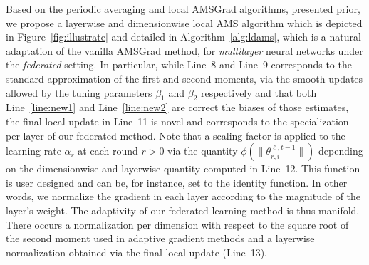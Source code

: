 \documentclass[11pt]{article}
\begin{document}
Based on the periodic averaging and local AMSGrad algorithms, presented prior, we propose a layerwise and dimensionwise local AMS algorithm which is depicted in Figure~\ref{fig:illustrate} and detailed in Algorithm~\ref{alg:ldams}, which is a natural adaptation of the vanilla AMSGrad method, for \emph{multilayer} neural networks under the \emph{federated} setting.
In particular, while Line~8 and Line~9 corresponds to the standard approximation of the first and second moments, via the smooth updates allowed by the tuning parameters $\beta_1$ and $\beta_2$ respectively and that both Line~\ref{line:new1} and Line~\ref{line:new2} are correct the biases of those estimates, the final local update in Line~11 is novel and corresponds to the specialization per layer of our federated method.
Note that a scaling factor is applied to the learning rate $\alpha_r$ at each round $r>0$ via the quantity $\phi(\|\theta_{r,i}^{\ell,t-1}\|)$ depending on the dimensionwise and layerwise quantity computed in Line~12.
This function is user designed and can be, for instance, set to the identity function. 
In other words, we normalize the gradient in each layer according to the magnitude of the layer's weight.
The adaptivity of our federated learning method is thus manifold. 
There occurs a normalization per dimension with respect to the square root of the second moment used in adaptive gradient methods and a layerwise normalization obtained via the final local update (Line~13).
\end{document}
